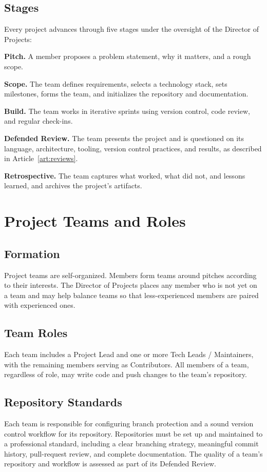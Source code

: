 \documentclass[12pt,letterpaper]{article} %
\begin{document}
\subsection{Stages}\label{sec:lifecycle-stages}
Every project advances through five stages under the oversight of the Director of Projects:
\begin{alphalist}
  \item \textbf{Pitch.} A member proposes a problem statement, why it matters, and a rough
  scope.
  \item \textbf{Scope.} The team defines requirements, selects a technology stack, sets
  milestones, forms the team, and initializes the repository and documentation.
  \item \textbf{Build.} The team works in iterative sprints using version control, code review,
  and regular check-ins.
  \item \textbf{Defended Review.} The team presents the project and is questioned on its
  language, architecture, tooling, version control practices, and results, as described in
  Article~\ref{art:reviews}.
  \item \textbf{Retrospective.} The team captures what worked, what did not, and lessons
  learned, and archives the project's artifacts.
\end{alphalist}

\section{Project Teams and Roles}\label{art:teams}
\subsection{Formation}\label{sec:team-formation}
Project teams are self-organized. Members form teams around pitches according to their
interests. The Director of Projects places any member who is not yet on a team and may help
balance teams so that less-experienced members are paired with experienced ones.
\subsection{Team Roles}\label{sec:team-roles}
Each team includes a Project Lead and one or more Tech Leads / Maintainers, with the remaining
members serving as Contributors. All members of a team, regardless of role, may write code and
push changes to the team's repository.
\subsection{Repository Standards}\label{sec:repo-standards}
Each team is responsible for configuring branch protection and a sound version control workflow
for its repository. Repositories must be set up and maintained to a professional standard,
including a clear branching strategy, meaningful commit history, pull-request review, and
complete documentation. The quality of a team's repository and workflow is assessed as part of
its Defended Review.
\end{document}

